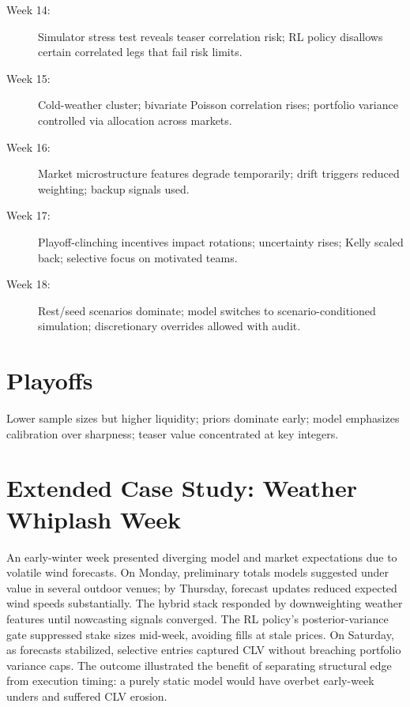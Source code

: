 \begin{description}
  \item[Week 14:] Simulator stress test reveals teaser correlation risk; RL policy disallows certain correlated legs that fail risk limits.
  \item[Week 15:] Cold-weather cluster; bivariate Poisson correlation rises; portfolio variance controlled via allocation across markets.
  \item[Week 16:] Market microstructure features degrade temporarily; drift triggers reduced weighting; backup signals used.
  \item[Week 17:] Playoff-clinching incentives impact rotations; uncertainty rises; Kelly scaled back; selective focus on motivated teams.
  \item[Week 18:] Rest/seed scenarios dominate; model switches to scenario-conditioned simulation; discretionary overrides allowed with audit.
\end{description}

\section{Playoffs}\label{app:cases-playoffs}
Lower sample sizes but higher liquidity; priors dominate early; model emphasizes calibration over sharpness; teaser value concentrated at key integers.

\section{Extended Case Study: Weather Whiplash Week}\label{app:cases-weather}
An early-winter week presented diverging model and market expectations due to volatile wind forecasts. On Monday, preliminary totals models suggested under value in several outdoor venues; by Thursday, forecast updates reduced expected wind speeds substantially. The hybrid stack responded by downweighting weather features until nowcasting signals converged. The RL policy's posterior-variance gate suppressed stake sizes mid-week, avoiding fills at stale prices. On Saturday, as forecasts stabilized, selective entries captured CLV without breaching portfolio variance caps. The outcome illustrated the benefit of separating structural edge from execution timing: a purely static model would have overbet early-week unders and suffered CLV erosion.

